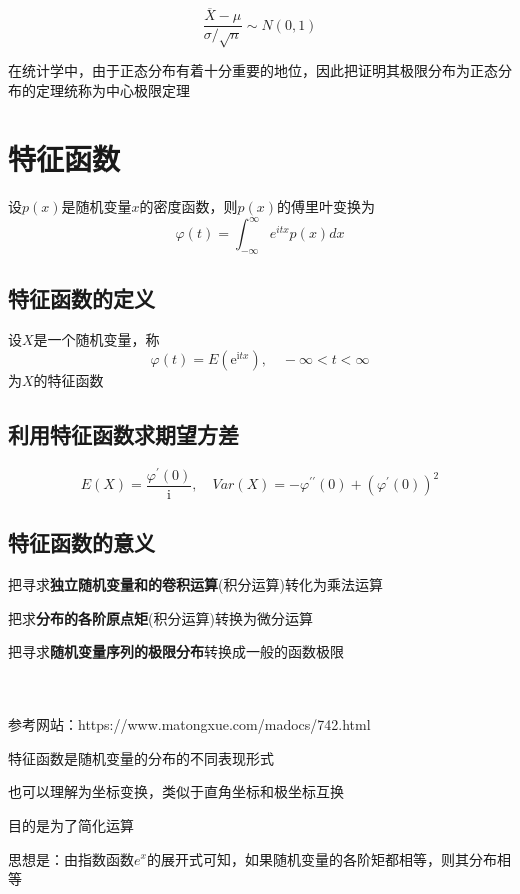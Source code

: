 \documentclass[UTF8,10pt]{book}
\begin{document}
                $$ \frac{\overline{X} - \mu}{\sigma / \sqrt{n}} \sim N(0,1) $$

                {\kaishu 在统计学中，由于正态分布有着十分重要的地位，因此把证明其极限分布为正态分布的定理统称为中心极限定理}



            







\clearpage
\chapter{特征函数}
 设$p(x)$是随机变量$x$的密度函数，则$p(x)$的傅里叶变换为 $$ \varphi(t)=\int_{-\infty}^{\infty} e^{i t x} p(x) d x $$

	\section{特征函数的定义}
 设$X$是一个随机变量，称 $$ \varphi(t)=E\left(\mathrm{e}^{\mathrm{i} t x}\right), \quad-\infty<t<\infty $$
 为$X$的特征函数
 
	\section{利用特征函数求期望方差}
 $$ E(X)=\frac{\varphi^{\prime}(0)}{\mathrm{i}}, \quad Var(X)=-\varphi^{\prime \prime}(0)+\left(\varphi^{\prime}(0)\right)^{2} $$
	\clearpage
		\section{特征函数的意义}
	{\kaishu 
		把寻求\textbf{独立随机变量和的卷积运算}(积分运算)转化为乘法运算
		
		把求\textbf{分布的各阶原点矩}(积分运算)转换为微分运算
		
		把寻求\textbf{随机变量序列的极限分布}转换成一般的函数极限
	}\\
	\\
	
	
	参考网站：https://www.matongxue.com/madocs/742.html
	
	{\kaishu 特征函数是随机变量的分布的不同表现形式
		
		也可以理解为坐标变换，类似于直角坐标和极坐标互换
		
		目的是为了简化运算}
	
	思想是：由指数函数$e^x$的展开式可知，如果随机变量的各阶矩都相等，则其分布相等
	
\end{document}

